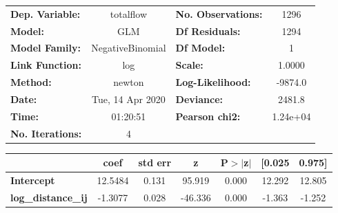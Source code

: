 \begin{center}
\begin{tabular}{lclc}
\toprule
\textbf{Dep. Variable:}    &    totalflow     & \textbf{  No. Observations:  } &     1296    \\
\textbf{Model:}            &       GLM        & \textbf{  Df Residuals:      } &     1294    \\
\textbf{Model Family:}     & NegativeBinomial & \textbf{  Df Model:          } &        1    \\
\textbf{Link Function:}    &       log        & \textbf{  Scale:             } &    1.0000   \\
\textbf{Method:}           &      newton      & \textbf{  Log-Likelihood:    } &   -9874.0   \\
\textbf{Date:}             & Tue, 14 Apr 2020 & \textbf{  Deviance:          } &    2481.8   \\
\textbf{Time:}             &     01:20:51     & \textbf{  Pearson chi2:      } &  1.24e+04   \\
\textbf{No. Iterations:}   &        4         & \textbf{                     } &             \\
\bottomrule
\end{tabular}
\begin{tabular}{lcccccc}
                           & \textbf{coef} & \textbf{std err} & \textbf{z} & \textbf{P$> |$z$|$} & \textbf{[0.025} & \textbf{0.975]}  \\
\midrule
\textbf{Intercept}         &      12.5484  &        0.131     &    95.919  &         0.000        &       12.292    &       12.805     \\
\textbf{log\_distance\_ij} &      -1.3077  &        0.028     &   -46.336  &         0.000        &       -1.363    &       -1.252     \\
\bottomrule
\end{tabular}
\end{center}